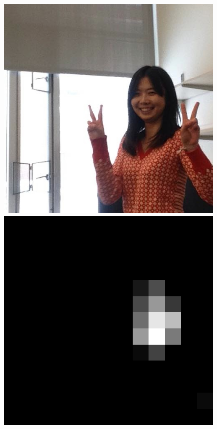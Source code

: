 \documentclass{article}
\begin{document}
\begin{figure}[!h]
\vskip 0.2in
\begin{center}
  \includegraphics[width=.5\linewidth]{demo_face/wendy_06.jpg}\includegraphics[width=.5\linewidth]{demo_face/face_wendy_06.png} \\
  \vspace{.5ex}

\end{center}
\end{figure}
\end{document}
